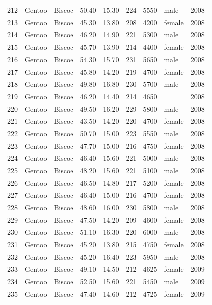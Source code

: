 \documentclass{article}\usepackage[]{graphicx}\usepackage[]{xcolor}
\begin{document}
\begin{table}[ht]
\begin{tabular}{rllrrrrlr}
  212 & Gentoo & Biscoe & 50.40 & 15.30 & 224 & 5550 & male & 2008 \\ 
  213 & Gentoo & Biscoe & 45.30 & 13.80 & 208 & 4200 & female & 2008 \\ 
  214 & Gentoo & Biscoe & 46.20 & 14.90 & 221 & 5300 & male & 2008 \\ 
  215 & Gentoo & Biscoe & 45.70 & 13.90 & 214 & 4400 & female & 2008 \\ 
  216 & Gentoo & Biscoe & 54.30 & 15.70 & 231 & 5650 & male & 2008 \\ 
  217 & Gentoo & Biscoe & 45.80 & 14.20 & 219 & 4700 & female & 2008 \\ 
  218 & Gentoo & Biscoe & 49.80 & 16.80 & 230 & 5700 & male & 2008 \\ 
  219 & Gentoo & Biscoe & 46.20 & 14.40 & 214 & 4650 &  & 2008 \\ 
  220 & Gentoo & Biscoe & 49.50 & 16.20 & 229 & 5800 & male & 2008 \\ 
  221 & Gentoo & Biscoe & 43.50 & 14.20 & 220 & 4700 & female & 2008 \\ 
  222 & Gentoo & Biscoe & 50.70 & 15.00 & 223 & 5550 & male & 2008 \\ 
  223 & Gentoo & Biscoe & 47.70 & 15.00 & 216 & 4750 & female & 2008 \\ 
  224 & Gentoo & Biscoe & 46.40 & 15.60 & 221 & 5000 & male & 2008 \\ 
  225 & Gentoo & Biscoe & 48.20 & 15.60 & 221 & 5100 & male & 2008 \\ 
  226 & Gentoo & Biscoe & 46.50 & 14.80 & 217 & 5200 & female & 2008 \\ 
  227 & Gentoo & Biscoe & 46.40 & 15.00 & 216 & 4700 & female & 2008 \\ 
  228 & Gentoo & Biscoe & 48.60 & 16.00 & 230 & 5800 & male & 2008 \\ 
  229 & Gentoo & Biscoe & 47.50 & 14.20 & 209 & 4600 & female & 2008 \\ 
  230 & Gentoo & Biscoe & 51.10 & 16.30 & 220 & 6000 & male & 2008 \\ 
  231 & Gentoo & Biscoe & 45.20 & 13.80 & 215 & 4750 & female & 2008 \\ 
  232 & Gentoo & Biscoe & 45.20 & 16.40 & 223 & 5950 & male & 2008 \\ 
  233 & Gentoo & Biscoe & 49.10 & 14.50 & 212 & 4625 & female & 2009 \\ 
  234 & Gentoo & Biscoe & 52.50 & 15.60 & 221 & 5450 & male & 2009 \\ 
  235 & Gentoo & Biscoe & 47.40 & 14.60 & 212 & 4725 & female & 2009 \\ 

\end{tabular}
\end{table}
\end{document}
